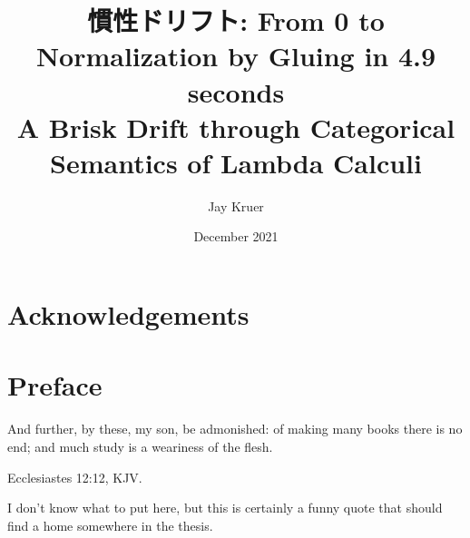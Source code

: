 \documentclass[12pt,twoside]{reedthesis}
\title{慣性ドリフト: From 0 to Normalization by Gluing in 4.9 seconds\\ A Brisk Drift through Categorical Semantics of Lambda Calculi}
\author{Jay Kruer}
\date{December 2021}
\theoremstyle{definition}
\theoremstyle{remark}
\theoremstyle{plain}
\begin{document}
\maketitle
\frontmatter %
\pagestyle{empty} %

\chapter*{Acknowledgements}






\chapter*{Preface}
\epigraph{And further, by these, my son, be admonished: of making many books
  there is no end; and much study is a weariness of the flesh.}{Ecclesiastes
  12:12, KJV.}

I don't know what to put here, but this is certainly a funny quote that should
find a home somewhere in the thesis.

\end{document}
